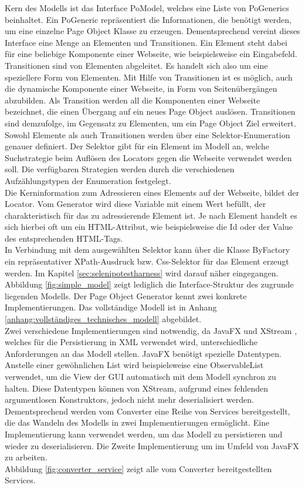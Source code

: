 Kern des Modells ist das Interface PoModel, welches eine Liste von PoGenerics beinhaltet. Ein PoGeneric repräsentiert die Informationen, die benötigt werden, um eine einzelne Page Object Klasse zu erzeugen. Dementsprechend vereint dieses Interface eine Menge an Elementen und Transitionen.
Ein Element steht dabei für eine beliebige Komponente einer Webseite, wie beispielsweise ein Eingabefeld.
Transitionen sind von Elementen abgeleitet. Es handelt sich also um eine speziellere Form von Elementen. Mit Hilfe von Transitionen ist es möglich, auch die dynamische Komponente einer Webseite, in Form von Seitenübergängen abzubilden. Als Transition werden all die Komponenten einer Webseite bezeichnet, die einen Übergang auf ein neues Page Object auslösen. Transitionen sind demzufolge, im Gegensatz zu Elementen, um ein Page Object Ziel erweitert.\\
Sowohl Elemente als auch Transitionen werden über eine Selektor-Enumeration genauer definiert.
Der Selektor gibt für ein Element im Modell an, welche Suchstrategie beim Auflösen des Locators gegen die Webseite verwendet werden soll.
Die verfügbaren Strategien werden durch die verschiedenen Aufzählungstypen der Enumeration festgelegt.\\
Die Kerninformation zum Adressieren eines Elements auf der Webseite, bildet der Locator. Vom Generator wird diese Variable mit einem Wert befüllt, der charakteristisch für das zu adressierende Element ist. Je nach Element handelt es sich hierbei oft um ein HTML-Attribut, wie beispielsweise die Id oder der Value des entsprechenden HTML-Tags.\\
In Verbindung mit dem ausgewählten Selektor kann über die Klasse ByFactory ein repräsentativer XPath-Ausdruck bzw. Css-Selektor für das Element erzeugt werden. Im Kapitel \ref{sec:selenipotestharness} wird darauf näher eingegangen.\\
Abbildung \ref{fig:simple_model} zeigt lediglich die Interface-Struktur des zugrunde liegenden Modells. Der Page Object Generator kennt zwei konkrete Implementierungen. Das vollständige Modell ist in Anhang \ref{anhang:vollständiges_technisches_modell} abgebildet.\\
Zwei verschiedene Implementierungen sind notwendig, da JavaFX und XStream \cite{joe_walnes_xstream_2015}, welches für die Persistierung in XML verwendet wird, unterschiedliche Anforderungen an das Modell stellen. JavaFX benötigt spezielle Datentypen. Anstelle einer gewöhnlichen List wird beispielsweise eine ObservableList verwendet, um die View der GUI automatisch mit dem Modell synchron zu halten. Diese Datentypen können von XStream, aufgrund eines fehlenden argumentlosen Konstruktors, jedoch nicht mehr deserialisiert werden.
Dementsprechend werden vom Converter eine Reihe von Services bereitgestellt, die das Wandeln des Modells in zwei Implementierungen ermöglicht. Eine Implementierung kann verwendet werden, um das Modell zu persistieren und wieder zu deserialisieren. Die Zweite Implementierung um im Umfeld von JavaFX zu arbeiten.\\
Abbildung \ref{fig:converter_service} zeigt alle vom Converter bereitgestellten Services. 

